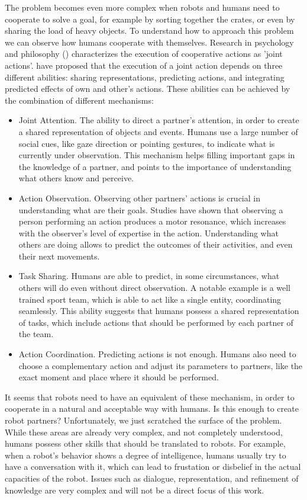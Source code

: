 The problem becomes even more complex when robots and humans need to cooperate to solve a goal, for example by sorting together the crates, or even by sharing the load of heavy objects. To understand  how to approach this problem we can observe how humans cooperate with themselves. Research in psychology and philosophy (\cite{pacherie2012phenomenology}) characterizes the execution of cooperative actions as 'joint actions'. \cite{sebanz2006joint} have proposed that the execution of a joint action depends on three different abilities: sharing representations, predicting actions, and integrating predicted effects of own and other's actions. These abilities can be achieved by the combination of different mechanisms:
\begin{itemize}
\item Joint Attention. The ability to direct a partner's attention, in order to create a shared representation of objects and events. Humans use a large number of social cues, like gaze direction or pointing gestures, to indicate what is currently under observation. This mechanism helps filling important gaps in the knowledge of a partner, and points to the importance of understanding what others know and perceive.
\item Action Observation. Observing other partners' actions is crucial in understanding what are their goals. Studies have shown that observing a person performing an action produces a motor resonance, which increases with the observer's level of expertise in the action. Understanding what others are doing allows to predict the outcomes of their activities, and even their next movements.
\item Task Sharing. Humans are able to predict, in some circumstances, what others will do  even without direct observation. A notable example is a well trained sport team, which is able to act like a single entity, coordinating seamlessly. This ability suggests that humans possess a shared representation of tasks, which include actions that should be performed by each partner of the team.
\item Action Coordination. Predicting actions is not enough. Humans also need to choose a complementary action and adjust its parameters to partners, like the exact moment and place where it should be performed. 
\end{itemize}

It seems that robots need to have an equivalent of these mechanism, in order to cooperate in a natural and acceptable way with humans. Is this enough to create robot partners? Unfortunately, we just scratched the surface of the problem. While these areas are already very complex, and not completely understood, humans possess other skills that should be translated to robots. For example, when a robot's behavior shows a degree of intelligence, humans usually try to have a conversation with it, which can lead to frustation or disbelief in the actual capacities of the robot. Issues such as dialogue, representation, and refinement of knowledge are very complex and will not be a direct focus of this work.

